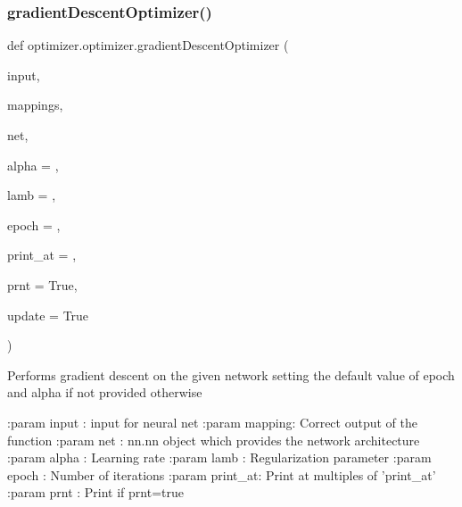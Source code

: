 \subsubsection{\texorpdfstring{gradient\+Descent\+Optimizer()}{gradientDescentOptimizer()}}
{\footnotesize\ttfamily def optimizer.\+optimizer.\+gradient\+Descent\+Optimizer (\begin{DoxyParamCaption}\item[{}]{input,  }\item[{}]{mappings,  }\item[{}]{net,  }\item[{}]{alpha = {},  }\item[{}]{lamb = {},  }\item[{}]{epoch = {},  }\item[{}]{print\+\_\+at = {},  }\item[{}]{prnt = {\ttfamily True},  }\item[{}]{update = {\ttfamily True} }\end{DoxyParamCaption})\hspace{0.3cm}{\ttfamily [static]}}

\begin{DoxyVerb}Performs gradient descent on the given network setting the default value of epoch and alpha if not provided otherwise

:param input  : input for neural net
:param mapping: Correct output of the function
:param net    : nn.nn object which provides the network architecture
:param alpha  : Learning rate
:param lamb   : Regularization parameter
:param epoch  : Number of iterations
:param print_at: Print at multiples of 'print_at'
:param prnt   : Print if prnt=true
\end{DoxyVerb}
 \mbox{\label{classoptimizer_1_1optimizer_a0daa3477ecb2e73e07de11560d197f48}} 
